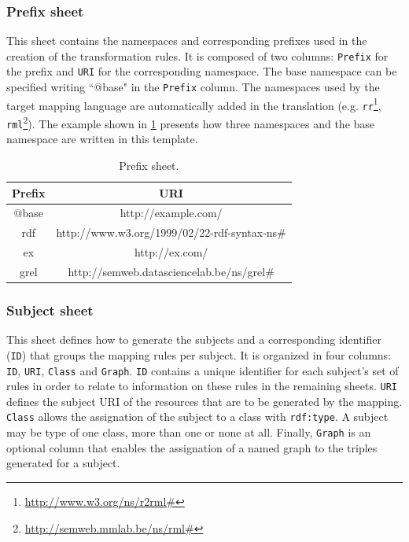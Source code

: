 
\subsubsection{Prefix sheet} 
This sheet contains the namespaces and corresponding prefixes used in the creation of the transformation rules. 
It is composed of two columns: \texttt{Prefix} for the prefix and \texttt{URI} for the corresponding namespace. The base namespace can be specified writing ``@base" in the \texttt{Prefix} column. The namespaces used by the target mapping language are automatically added in the translation (e.g. \texttt{rr}\footnote{\url{http://www.w3.org/ns/r2rml\#}}, \texttt{rml}\footnote{\url{http://semweb.mmlab.be/ns/rml\#}}).
The example shown in \cref{tab:prefix_sheet} presents how three namespaces and the base namespace are written in this template. 

\begin{table}[h!]
\caption{Prefix sheet.}
\label{tab:prefix_sheet}
\centering
\begin{tabular}{c|c}
\midrule
\textbf{Prefix} & \textbf{URI}                                 \\ \midrule
@base           & http://example.com/                          \\
rdf             & http://www.w3.org/1999/02/22-rdf-syntax-ns\# \\
ex              & http://ex.com/                               \\ 
grel            & http://semweb.datasciencelab.be/ns/grel\#     \\
\midrule
\end{tabular}
\end{table}


\subsubsection{Subject sheet} 
This sheet defines how to generate the subjects and a corresponding identifier (\texttt{ID}) that groups the mapping rules per subject. It is organized in four columns: \texttt{ID}, \texttt{URI}, \texttt{Class} and \texttt{Graph}. \texttt{ID} contains a unique identifier for each subject's set of rules in order to relate to information on these rules in the remaining sheets.
\texttt{URI} defines the subject URI of the resources that are to be generated by the mapping. 
\texttt{Class} allows the assignation of the subject to a class with \texttt{rdf:type}. A subject may be type of one class, more than one or none at all. 
Finally, \texttt{Graph} is an optional column that enables the assignation of a named graph to the triples generated for a subject.

